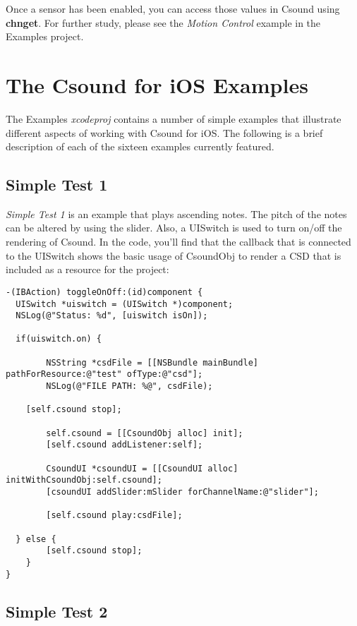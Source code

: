 \documentclass[11pt]{article}
\begin{document}
Once a sensor has been enabled, you can access those values in Csound using \textbf{chnget}. For further study, please see the \emph{Motion Control} example in the Examples project.


\section{The Csound for iOS Examples}

The Examples \textit{xcodeproj} contains a number of simple examples that illustrate different aspects of working with Csound for iOS.  The following is a brief description of each of the sixteen examples currently featured.

\subsection{Simple Test 1}

\emph{Simple Test 1} is an example that plays ascending notes.  The pitch of the notes can be altered by using the slider.  Also, a UISwitch is used to turn on/off the rendering of Csound.  In the code, you'll find that the callback that is connected to the UISwitch shows the basic usage of CsoundObj to render a CSD that is included as a resource for the project:

\begin{lstlisting}[caption=Example code showing configuring and starting a CsoundObj]
-(IBAction) toggleOnOff:(id)component {
  UISwitch *uiswitch = (UISwitch *)component;
  NSLog(@"Status: %d", [uiswitch isOn]);

  if(uiswitch.on) {

        NSString *csdFile = [[NSBundle mainBundle] pathForResource:@"test" ofType:@"csd"];
        NSLog(@"FILE PATH: %@", csdFile);

    [self.csound stop];

        self.csound = [[CsoundObj alloc] init];
        [self.csound addListener:self];

        CsoundUI *csoundUI = [[CsoundUI alloc] initWithCsoundObj:self.csound];
        [csoundUI addSlider:mSlider forChannelName:@"slider"];

        [self.csound play:csdFile];

  } else {
        [self.csound stop];
    }
}

\end{lstlisting}

\subsection{Simple Test 2}
\end{document}
